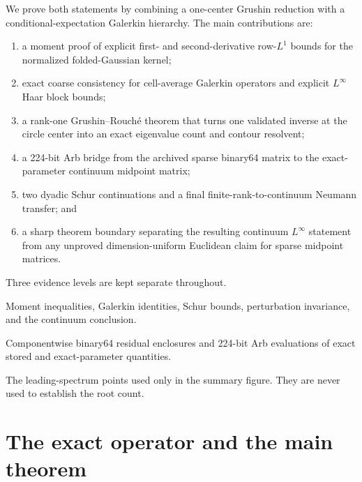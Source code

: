\documentclass[11pt]{article}
\theoremstyle{definition}
\theoremstyle{remark}
\begin{document}
We prove both statements by combining a one-center Grushin reduction with a
conditional-expectation Galerkin hierarchy.  The main contributions are:
\begin{enumerate}[leftmargin=2em]
 \item a moment proof of explicit first- and second-derivative row-$L^1$
       bounds for the normalized folded-Gaussian kernel;
 \item exact coarse consistency for cell-average Galerkin operators and
       explicit $L^\infty$ Haar block bounds;
 \item a rank-one Grushin--Rouch\'e theorem that turns one validated inverse
       at the circle center into an exact eigenvalue count and contour
       resolvent;
 \item a 224-bit Arb bridge from the archived sparse binary64 matrix to the
       exact-parameter continuum midpoint matrix;
 \item two dyadic Schur continuations and a final finite-rank-to-continuum
       Neumann transfer; and
 \item a sharp theorem boundary separating the resulting continuum
       $L^\infty$ statement from any unproved dimension-uniform Euclidean
       claim for sparse midpoint matrices.
\end{enumerate}

Three evidence levels are kept separate throughout.
\begin{description}[leftmargin=3.2cm,style=nextline]
 \item[Analytic operator theorem]
 Moment inequalities, Galerkin identities, Schur bounds, perturbation
 invariance, and the continuum conclusion.
 \item[Outward certificate]
 Componentwise binary64 residual enclosures and 224-bit Arb evaluations of
 exact stored and exact-parameter quantities.
 \item[Floating diagnostic]
 The leading-spectrum points used only in the summary figure.  They are
 never used to establish the root count.
\end{description}

\section{The exact operator and the main theorem}
\label{sec:model}
\end{document}
